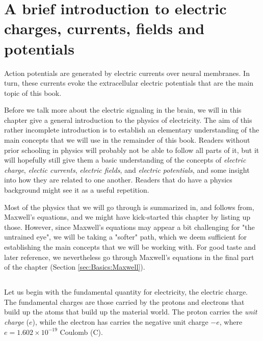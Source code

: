 \chapter{A brief introduction to electric charges, currents, fields and potentials} 
\label{sec:Basics}
Action potentials are generated by electric currents over neural membranes. In turn, these currents
evoke the extracellular electric potentials that are the main topic of this book. 

Before we talk more about the electric signaling in the brain, we will in this chapter give a general introduction to the physics of electricity. The aim of this rather incomplete introduction is to establish an elementary understanding of the main concepts that we will use in the remainder of this book. Readers without prior schooling in physics will probably not be able to follow all parts of it, but it will hopefully still give them a basic understanding of the concepts of \textit{electric charge}, \textit{electic currents}, \textit{electric fields}, and \textit{electric potentials}, and some insight into how they are related to one another. Readers that do have a physics background might see it as a useful repetition. 

Most of the physics that we will go through is summarized in, and follows from, Maxwell's equations, and we might have kick-started this chapter by listing up those. However, since Maxwell's equations may appear a bit challenging for "the untrained eye", we will be taking a "softer" path, which we deem sufficient for establishing the main concepts that we will be working with. For good taste and later reference, we nevertheless go through Maxwell's equations in the final part of the chapter (Section \ref{sec:Basics:Maxwell}).


\section{}
\label{Sec:Basics:Charge} 
Let us begin with the fundamental quantity for electricity, the electric charge. The fundamental charges are those carried by the protons and electrons that build up the atoms that build up the material world. The proton carries the \textit{unit charge} ($e$), while the electron has carries the negative unit charge $-e$, where $e = 1.602\times10^{-19}$ Coulomb (C). 

